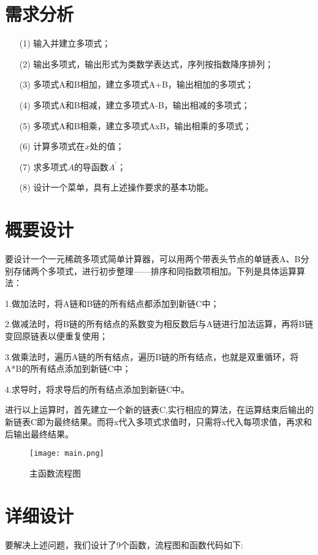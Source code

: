 \documentclass{DateStructure}
\begin{document}
	
\makecover
\newpage

\thispagestyle{empty}
\tableofcontents   

\newpage
\setcounter{page}{1} 
	
\section{需求分析}
\begin{itemize}
\item[(1)]输入并建立多项式；
\item[(2)]输出多项式，输出形式为类数学表达式，序列按指数降序排列；
\item[(3)]多项式A和B相加，建立多项式A+B，输出相加的多项式；
\item[(4)]多项式A和B相减，建立多项式A-B，输出相减的多项式；
\item[(5)]多项式A和B相乘，建立多项式AxB，输出相乘的多项式；	
\item[(6)]计算多项式在$x$处的值；
\item[(7)]求多项式$A$的导函数$A^{'}$；
\item[(8)]设计一个菜单，具有上述操作要求的基本功能。
\end{itemize}

\section{概要设计}
要设计一个一元稀疏多项式简单计算器，可以用两个带表头节点的单链表A、B分别存储两个多项式，进行初步整理——排序和同指数项相加。下列是具体运算算法：\par
1.做加法时，将A链和B链的所有结点都添加到新链C中；\par
2.做减法时，将B链的所有结点的系数变为相反数后与A链进行加法运算，再将B链变回原链表以便重复使用；\par
3.做乘法时，遍历A链的所有结点，遍历B链的所有结点，也就是双重循环，将A*B的所有结点添加到新链C中；\par
4.求导时，将求导后的所有结点添加到新链C中。\par
进行以上运算时，首先建立一个新的链表C,实行相应的算法，在运算结束后输出的新链表C即为最终结果。而将x代入多项式求值时，只需将x代入每项求值，再求和后输出最终结果。\par
\begin{figure}[H]
\centering
\texttt{[image: main.png]}
\caption{主函数流程图}
\end{figure}

\section{详细设计}
要解决上述问题，我们设计了9个函数，流程图和函数代码如下:\par		
\end{document}
